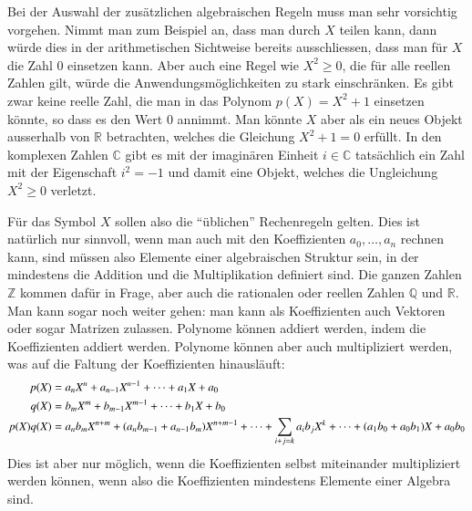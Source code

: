 Bei der Auswahl der zusätzlichen algebraischen Regeln muss man sehr
vorsichtig vorgehen.
Nimmt man zum Beispiel an, dass man durch $X$ teilen kann, dann würde
dies in der arithmetischen Sichtweise bereits ausschliessen, dass man
für $X$ die Zahl $0$ einsetzen kann.
Aber auch eine Regel wie $X^2 \ge 0$, die für alle reellen Zahlen gilt,
würde die Anwendungsmöglichkeiten zu stark einschränken.
Es gibt zwar keine reelle Zahl, die man in das Polynom $p(X)=X^2+1$
einsetzen könnte, so dass es den Wert $0$ annimmt.
Man könnte $X$ aber als ein neues Objekt ausserhalb von $\mathbb{R}$ 
betrachten, welches die Gleichung $X^2+1=0$ erfüllt.
In den komplexen Zahlen $\mathbb{C}$ gibt es mit der imaginären
Einheit $i\in\mathbb{C}$ tatsächlich ein Zahl mit der Eigenschaft
$i^2=-1$ und damit eine Objekt, welches die Ungleichung $X^2\ge 0$
verletzt.

Für das Symbol $X$ sollen also die ``üblichen'' Rechenregeln gelten.
Dies ist natürlich nur sinnvoll, wenn man auch mit den Koeffizienten
$a_0,\dots,a_n$ rechnen kann, sind müssen also Elemente einer 
algebraischen Struktur sein, in der mindestens die Addition und die
Multiplikation definiert sind.
Die ganzen Zahlen $\mathbb{Z}$ kommen dafür in Frage, aber auch
die rationalen oder reellen Zahlen $\mathbb{Q}$ und $\mathbb{R}$.
Man kann sogar noch weiter gehen: man kann als Koeffizienten auch
Vektoren oder sogar Matrizen zulassen.
Polynome können addiert werden, indem die Koeffizienten addiert werden.
Polynome können aber auch multipliziert werden, was auf die Faltung
der Koeffizienten hinausläuft:
\begin{align}
p(X) &= a_nX^n + a_{n-1}X^{n-1} + \dots + a_1X + a_0
\notag
\\
q(X) &= b_mX^m + b_{m-1}X^{m-1} + \dots + b_1X + b_0
\notag
\\
p(X) q(X) &=
a_{n}b_{m}X^{n+m}
+
(a_{n}b_{m-1}+a_{n-1}b_{m})X^{n+m-1}
+
\dots
+
\sum_{i + j = k}a_ib_j X^k
+
\dots
+
(a_1b_0+a_0b_1)X
+
a_0b_0
\label{buch:eqn:polynome:faltung}
\end{align}
Dies ist aber nur möglich, wenn die Koeffizienten selbst miteinander
multipliziert werden können, wenn also die Koeffizienten mindestens
Elemente einer Algebra sind.







